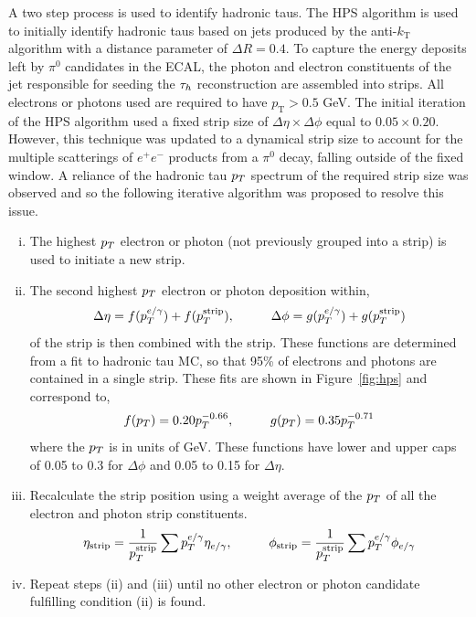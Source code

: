 A two step process is used to identify hadronic taus.
The \ac{HPS} algorithm is used to initially identify hadronic taus based on jets produced by the anti-$k_{\text{T}}$ algorithm with a distance parameter of $\Delta R = 0.4$. 
To capture the energy deposits left by $\pi^0$ candidates in the \ac{ECAL}, the photon and electron constituents of the jet responsible for seeding the $\tau_{h}$ reconstruction are assembled into strips. 
All electrons or photons used are required to have $p_{\text{T}} > 0.5$ GeV.
The initial iteration of the \ac{HPS} algorithm used a fixed strip size of $\Delta \eta \times \Delta \phi$ equal to $0.05 \times 0.20$.
However, this technique was updated to a dynamical strip size to account for the multiple scatterings of $e^+ e^-$ products from a $\pi^0$ decay, falling outside of the fixed window.
A reliance of the hadronic tau $p_{T}$ spectrum of the required strip size was observed and so the following iterative algorithm was proposed to resolve this issue.

\begin{enumerate}[i)]
\item The highest $p_{T}$ electron or photon (not previously grouped into a strip) is used to initiate a new strip.
\item The second highest $p_{T}$ electron or photon deposition within,
\begin{equation}
  \Delta \eta = f(p_{T}^{e/\gamma}) + f(p_{T}^{\text{strip}}), \hspace{1cm} \Delta \phi = g(p_{T}^{e/\gamma}) + g(p_{T}^{\text{strip}})
\end{equation}
of the strip is then combined with the strip.
These functions are determined from a fit to hadronic tau \ac{MC}, so that 95\% of electrons and photons are contained in a single strip.
These fits are shown in Figure~\ref{fig:hps} and correspond to,
\begin{equation}
f(p_{T}) = 0.20 p_{T}^{-0.66}, \hspace{1cm} g(p_{T}) = 0.35 p_{T}^{-0.71}
\end{equation}
where the $p_{T}$ is in units of GeV.
These functions have lower and upper caps of 0.05 to 0.3 for $\Delta\phi$ and 0.05 to 0.15 for $\Delta\eta$.
\item Recalculate the strip position using a weight average of the $p_{T}$ of all the electron and photon strip constituents.
\begin{equation}
\eta_{\text{strip}} = \frac{1}{p_{T}^{\text{strip}}} \sum p_{T}^{e/\gamma} \eta_{e/\gamma}, \hspace{1cm} \phi_{\text{strip}} = \frac{1}{p_{T}^{\text{strip}}} \sum p_{T}^{e/\gamma} \phi_{e/\gamma}
\end{equation}
\item Repeat steps (ii) and (iii) until no other electron or photon candidate fulfilling condition (ii) is found.
\end{enumerate}

